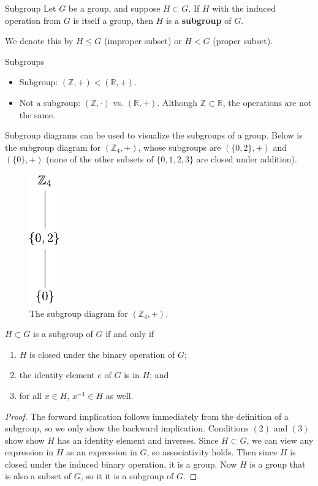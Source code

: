\documentclass[10pt]{report}
\begin{document}
\begin{defn}{Subgroup}{}
Let $G$ be a group, and suppose $H \subset G$. If $H$ with the induced operation from $G$ is itself a group, then $H$ is a \textbf{subgroup} of $G$.

We denote this by $H \leq G$ (improper subset) or $H < G$ (proper subset).
\end{defn}

\begin{ex}{Subgroups}{}
\begin{itemize}
	\item Subgroup: $(\mathbb{Z}, +) < (\mathbb{R},+)$.
	\item Not a subgroup: $(\mathbb{Z}, \cdot)$ vs. $(\mathbb{R}, +)$. Although $\mathbb{Z} \subset \mathbb{R}$, the operations are not the same.
\end{itemize}
\end{ex}

Subgroup diagrams can be used to visualize the subgroups of a group. Below is the subgroup diagram for $(\mathbb{Z}_4, +)$, whose subgroups are $(\{0,2\}, +)$ and $(\{0\}, +)$ (none of the other subsets of $\{0,1,2,3\}$ are closed under addition).
\begin{figure}[H]
	\centering
	\includegraphics[scale=1]{fig/subgroup-ex.pdf}
	\caption{The subgroup diagram for $(\mathbb{Z}_4, +)$.}
\end{figure}

\begin{prop}
	\label{prop:subgroup}
	$H \subset G$ is a subgroup of $G$ if and only if
	\begin{enumerate}
		\item $H$ is closed under the binary operation of $G$;
		\item the identity element $e$ of $G$ is in $H$; and
		\item for all $x \in H$, $x^{-1} \in H$ as well.
	\end{enumerate}
\end{prop}
\begin{proof}
	The forward implication follows immediately from the definition of a subgroup, so we only show the backward implication. Conditions $(2)$ and $(3)$ show show $H$ has an identity element and inverses. Since $H \subset G$, we can view any expression in $H$ as an expression in $G$, so associativity holds. Then since $H$ is closed under the induced binary operation, it is a group. Now $H$ is a group that is also a subset of $G$, so it it is a subgroup of $G$.
\end{proof}
\end{document}
